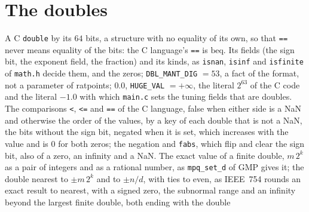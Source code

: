 \section{The doubles}\label{sec:doubles}

\begin{definition}\label{def:Double}
  \leanok
  A C \verb|double| by its $64$ bits, a structure with no equality of its own, so that \verb|==|
  never means equality of the bits: the C language's \verb|==| is $\mathrm{beq}$. Its fields (the
  sign bit, the exponent field, the fraction) and its kinds, as \verb|isnan|, \verb|isinf| and
  \verb|isfinite| of \verb|math.h| decide them, and the zeros; \verb|DBL_MANT_DIG| $= 53$, a fact of
  the format, not a parameter of ratpoints; $0.0$, \verb|HUGE_VAL| $= +\infty$, the literal $2^{63}$
  of the C code and the literal $-1.0$ with which \verb|main.c| sets the tuning fields that are
  doubles. The comparisons \verb|<|, \verb|<=| and \verb|==| of the C language, false when either
  side is a NaN and otherwise the order of the values, by a key of each double that is not a NaN,
  the bits without the sign bit, negated when it is set, which increases with the value and is $0$
  for both zeros; the negation and \verb|fabs|, which flip and clear the sign bit, also of a zero,
  an infinity and a NaN. The exact value of a finite double, $m\,2^k$ as a pair of integers and as a
  rational number, as \verb|mpq_set_d| of GMP gives it; the double nearest to $\pm m\,2^k$ and to
  $\pm n/d$, with ties to even, as IEEE~754 rounds an exact result to nearest, with a signed zero,
  the subnormal range and an infinity beyond the largest finite double, both ending with the double

\end{definition}

